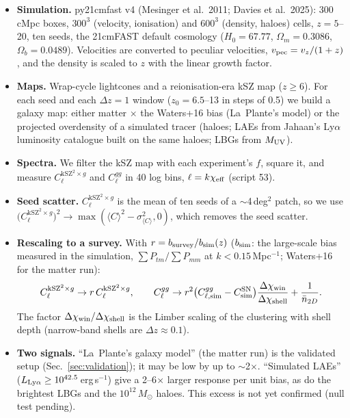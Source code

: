 \documentclass[11pt]{article}
\newcommand{\kSZ}{\mathrm{kSZ}}
\begin{document}
\begin{itemize}
\item \textbf{Simulation.} py21cmfast v4 (Mesinger et al.\ 2011; Davies et al.\ 2025): 300\,cMpc boxes, $300^3$ (velocity, ionisation) and $600^3$ (density, haloes) cells, $z=5$--20, ten seeds, the 21cmFAST default cosmology ($H_0=67.77$, $\Omega_m=0.3086$, $\Omega_b=0.0489$). Velocities are converted to peculiar velocities, $v_{\rm pec}=v_z/(1+z)$, and the density is scaled to $z$ with the linear growth factor.
\item \textbf{Maps.} Wrap-cycle lightcones and a reionisation-era kSZ map ($z\ge6$). For each seed and each $\Delta z=1$ window ($z_0=6.5$--13 in steps of 0.5) we build a galaxy map: either matter $\times$ the Waters+16 bias (La~Plante's model) or the projected overdensity of a simulated tracer (haloes; LAEs from Jahaan's Ly$\alpha$ luminosity catalogue built on the same haloes; LBGs from $M_{\rm UV}$).
\item \textbf{Spectra.} We filter the kSZ map with each experiment's $f$, square it, and measure $C_\ell^{\kSZ^2\times g}$ and $C_\ell^{gg}$ in 40 log bins, $\ell=k\chi_{\rm eff}$ (script 53).
\item \textbf{Seed scatter.} $C_\ell^{\kSZ^2\times g}$ is the mean of ten seeds of a $\sim$4\,deg$^2$ patch, so we use $\bigl(C_\ell^{\kSZ^2\times g}\bigr)^2\to\max(\langle C\rangle^2-\sigma^2_{\langle C\rangle},0)$, which removes the seed scatter.
\item \textbf{Rescaling to a survey.} With $r=b_{\rm survey}/b_{\rm sim}(z)$ ($b_{\rm sim}$: the large-scale bias measured in the simulation, $\sum P_{tm}/\sum P_{mm}$ at $k<0.15$\,Mpc$^{-1}$; Waters+16 for the matter run):
\begin{equation}
C_\ell^{\kSZ^2\times g}\to r\,C_\ell^{\kSZ^2\times g},\qquad
C_\ell^{gg}\to r^2\bigl(C^{gg}_{\ell,\rm sim}-C^{\rm SN}_{\rm sim}\bigr)\frac{\Delta\chi_{\rm win}}{\Delta\chi_{\rm shell}}+\frac{1}{\bar n_{2D}} .
\end{equation}
The factor $\Delta\chi_{\rm win}/\Delta\chi_{\rm shell}$ is the Limber scaling of the clustering with shell depth (narrow-band shells are $\Delta z\approx0.1$).
\item \textbf{Two signals.} ``La~Plante's galaxy model'' (the matter run) is the validated setup (Sec.~\ref{sec:validation}); it may be low by up to $\sim$2$\times$. ``Simulated LAEs'' ($L_{{\rm Ly}\alpha}\ge10^{42.5}$\,erg\,s$^{-1}$) give a 2--6$\times$ larger response per unit bias, as do the brightest LBGs and the $10^{12}\,M_\odot$ haloes. This excess is not yet confirmed (null test pending).
\end{itemize}
\end{document}
